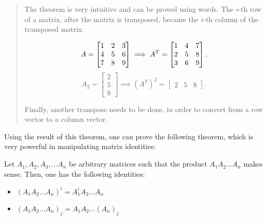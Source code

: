 \begin{quote}
  The theorem is very intuitive and can be proved using words. The \( i \)-th
  row of a matrix, after the matrix is transposed, became the \( i \)-th column
  of the transposed matrix.

  \[
    A = \begin{bmatrix}
      1 & 2 & 3 \\
      4 & 5 & 6 \\
      7 & 8 & 9
      \end{bmatrix} \implies A^{T} = \begin{bmatrix}
      1 & 4 & 7 \\
      2 & 5 & 8 \\
      3 & 6 & 9
    \end{bmatrix} \\
  .\]
  \[
    A_{2} = \begin{bmatrix} 2 \\ 5 \\ 8 \end{bmatrix} \implies
    (A^{T})^{2} = \begin{bmatrix} 2 & 5 & 8 \end{bmatrix} 
  .\] 

  Finally, another transpose needs to be done, in order to convert from a row
  vector to a column vector.
\end{quote}

Using the result of this theorem, one can prove the following theorem, which is
very powerful in manipulating matrix identities:

\begin{theorem}
  Let \( A_{1}, A_{2}, A_{3}, \ldots A_{n} \) be arbitrary matrices such that
  the product \( A_{1}A_{2}\ldots A_{n}  \) makes sense. Then, one has the
  following identities:

  \begin{itemize}
    \item \( (A_{1}A_{2}\ldots A_{n})^{i} = A_{1}^{i}A_{2}\ldots A_{n} \)
    \item \( (A_{1}A_{2}\ldots A_{n})_{j} = A_{1}A_{2}\ldots (A_{n})_{j} \)
  \end{itemize}
\end{theorem}

